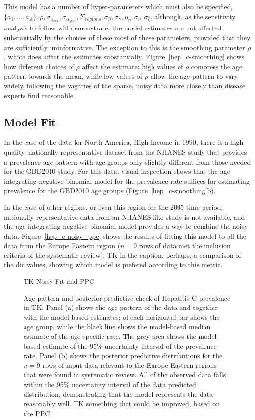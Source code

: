 This model has a number of hyper-parameters which must also be
specified, $\{a_1, \ldots, a_A\}, \rho, \sigma_{\alpha_{sex}},
\sigma_{\alpha_{year}}, \Sigma_{regions}, \sigma_\beta, \sigma_\gamma,
\mu_\eta, \sigma_\eta, \sigma_\zeta$, although, as the sensitivity
analysis to follow will demonstrate, the model estimates are not
affected substantially by the choices of these most of these
parameters, provided that they are sufficiently uninformative.  The
exception to this is the smoothing parameter $\rho$, which does affect
the estimates substantially.  Figure~\ref{hep_c-smoothing} shows how
different choices of $\rho$ affect the estimate: high values of $\rho$
compress the age pattern towards the mean, while low values of $\rho$
allow the age pattern to vary widely, following the vagaries of the
sparse, noisy data more closely than disease experts find reasonable.

\subsection{Model Fit}
In the case of the data for North America, High Income in 1990, there is a
high-quality, nationally representative dataset from the NHANES study
that provides a prevalence age pattern with age groups only slightly
different from those needed for the GBD2010 study.  For this data,
visual inspection shows that the age integrating negative binomial
model for the prevalence rate suffices for estimating prevalence for
the GBD2010 age groups (Figure~\ref{hep_c-smoothing}b).  

In the case of other regions, or even this region for the 2005 time
period, nationally representative data from an NHANES-like study is
not available, and the age integrating negative binomial model
provides a way to combine the noisy data.
Figure~\ref{hep_c-noisy_ppc} shows the results of fitting this model
to all the data from the Europe Eastern region ($n=9$ rows of data met
the inclusion criteria of the systematic review).  TK in the
caption, perhaps, a comparison of the dic values, showing which model
is prefered according to this metric.

\begin{figure}
\begin{center}
TK Noisy Fit and PPC
\end{center}
\caption{Age-pattern and posterior predictive check of Hepatitis C
  prevalence in TK.  Panel (a) shows the age pattern of the data and
  together with the model-based estimates; of each horizontal bar
  shows the age group, while the black line shows the model-based
  median estimate of the age-specific rate.  The grey area shows the
  model-based estimate of the 95\% uncertainty interval of the
  prevalence rate.  Panel (b) shows the posterior predictive
  distributions for the $n=9$ rows of input data relevant to the
  Europe Eastern regions that were found in systematic review.  All of
  the observed data falls within the 95\% uncertainty interval of the
  data predicted distribution, demonstrating that the model represents
  the data reasonably well.  TK something that could be improved,
  based on the PPC.}
\label{hep_c-noisy}
\end{figure}

